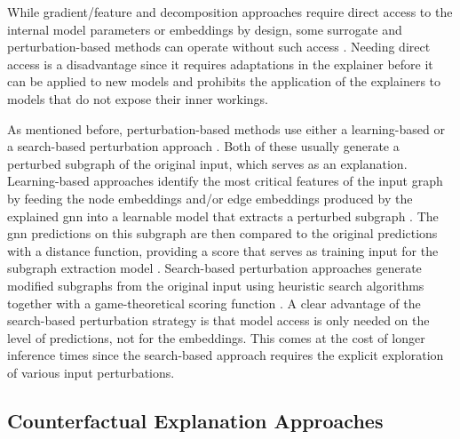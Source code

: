 While gradient/feature and decomposition approaches require direct access to the internal model parameters or embeddings by design, some surrogate and perturbation-based methods can operate without such access \cite{kakkad_survey_2023}. Needing direct access is a disadvantage since it requires adaptations in the explainer before it can be applied to new models and prohibits the application of the explainers to models that do not expose their inner workings.

As mentioned before, perturbation-based methods use either a learning-based or a search-based perturbation approach \cite{xia_explaining_2023}. Both of these usually generate a perturbed subgraph of the original input, which serves as an explanation. Learning-based approaches identify the most critical features of the input graph by feeding the node embeddings and/or edge embeddings produced by the explained \gls{gnn} into a learnable model that extracts a perturbed subgraph \cite{kakkad_survey_2023, xia_explaining_2023}. The \gls{gnn} predictions on this subgraph are then compared to the original predictions with a distance function, providing a score that serves as training input for the subgraph extraction model \cite{kakkad_survey_2023}. Search-based perturbation approaches generate modified subgraphs from the original input using heuristic search algorithms together with a game-theoretical scoring function \cite{xia_explaining_2023, yuan_explainability_2021}. A clear advantage of the search-based perturbation strategy is that model access is only needed on the level of predictions, not for the embeddings. This comes at the cost of longer inference times \cite{xia_explaining_2023} since the search-based approach requires the explicit exploration of various input perturbations.



\subsection{Counterfactual Explanation Approaches}
\label{s_ExplainingGNNs_CounterFactual}

